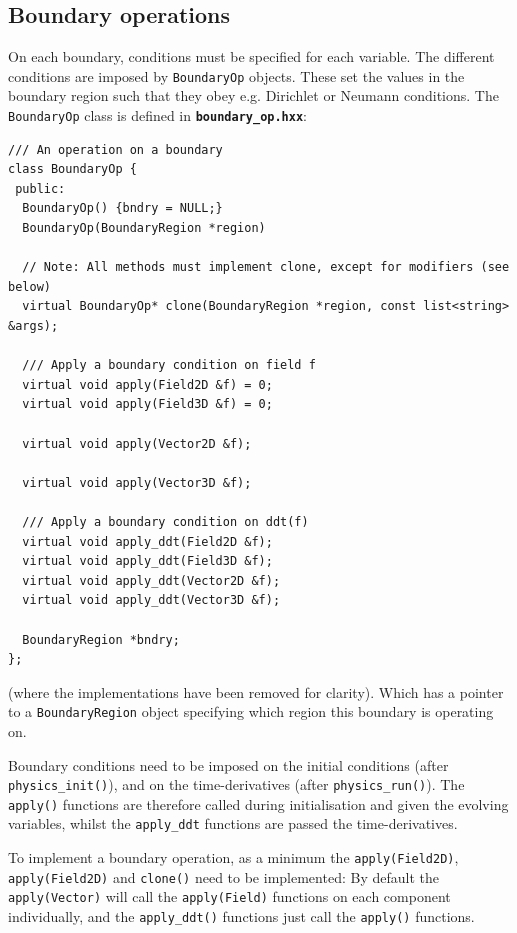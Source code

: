 \documentclass[12pt]{article}
\newcommand{\code}[1]{\texttt{#1}}
\newcommand{\file}[1]{\texttt{\bf #1}}
\begin{document}
\subsection{Boundary operations}

On each boundary, conditions must be specified for each variable. 
The different conditions are imposed by \code{BoundaryOp} objects.
These set the values in the boundary region such that they obey e.g.
Dirichlet or Neumann conditions. The \code{BoundaryOp} class is defined
in \file{boundary\_op.hxx}: 
\begin{lstlisting}[firstnumber=21]
/// An operation on a boundary
class BoundaryOp {
 public:
  BoundaryOp() {bndry = NULL;}
  BoundaryOp(BoundaryRegion *region)
  
  // Note: All methods must implement clone, except for modifiers (see below)
  virtual BoundaryOp* clone(BoundaryRegion *region, const list<string> &args);
  
  /// Apply a boundary condition on field f
  virtual void apply(Field2D &f) = 0;
  virtual void apply(Field3D &f) = 0;
  
  virtual void apply(Vector2D &f);
  
  virtual void apply(Vector3D &f);

  /// Apply a boundary condition on ddt(f)
  virtual void apply_ddt(Field2D &f);
  virtual void apply_ddt(Field3D &f);
  virtual void apply_ddt(Vector2D &f);
  virtual void apply_ddt(Vector3D &f);
  
  BoundaryRegion *bndry;
};
\end{lstlisting}
(where the implementations have been removed for clarity). 
Which has a pointer to a \code{BoundaryRegion} object specifying which
region this boundary is operating on.

Boundary conditions need to be imposed on the initial conditions (after
\code{physics\_init()}), and on the time-derivatives
(after \code{physics\_run()}). The \code{apply()} functions are therefore
called during initialisation and given the evolving variables, whilst the
\code{apply\_ddt} functions are passed the time-derivatives.

To implement a boundary operation, as a minimum the \code{apply(Field2D)}, 
\code{apply(Field2D)} and \code{clone()} need to be implemented: By default
the \code{apply(Vector)} will call the \code{apply(Field)} functions on each
component individually, and the \code{apply\_ddt()} functions just call
the \code{apply()} functions.
\end{document}
